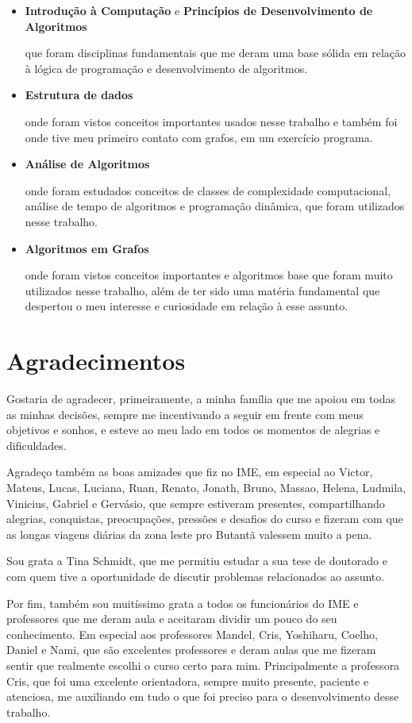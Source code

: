 \documentclass[a4paper,12pt]{article}
\begin{document}
\begin{itemize}
	\item \textbf{Introdução à Computação} e 
	\textbf{Princípios de Desenvolvimento de Algoritmos}


		que foram disciplinas fundamentais que me deram  
		 uma base sólida em relação
		à lógica de programação e desenvolvimento de algoritmos.

	\item \textbf{Estrutura de dados}

		onde foram vistos conceitos importantes usados 
		nesse trabalho e também foi
		onde tive meu primeiro contato com grafos,
		em um exercício programa.
		
	\item \textbf{Análise de Algoritmos}

		onde foram estudados conceitos de classes de complexidade computacional,
		análise de tempo de algoritmos e programação dinâmica, que foram
		utilizados nesse trabalho.

	\item \textbf{Algoritmos em Grafos}
	
		onde foram vistos conceitos importantes e algoritmos 
		base que foram muito utilizados nesse trabalho, 
		além de ter sido uma matéria fundamental que despertou o meu interesse 
		e curiosidade em relação à esse assunto.
\end{itemize}

\newpage

\section{Agradecimentos}
Gostaria de agradecer, primeiramente, a minha família
que me apoiou em todas as minhas decisões, sempre
me incentivando a seguir em frente com meus objetivos e sonhos,
e esteve ao meu lado em todos os momentos de alegrias e dificuldades.

Agradeço também as boas amizades que fiz no IME, em especial
ao Victor, Mateus, Lucas, Luciana, Ruan, Renato, Jonath, Bruno, Massao, 
Helena, Ludmila, Vinicius, Gabriel e Gervásio, que sempre 
estiveram presentes, compartilhando
alegrias, conquistas, preocupações, pressões e desafios do curso
e fizeram com que as longas viagens diárias da zona leste pro Butantã 
valessem muito a pena.

Sou grata a Tina Schmidt, que me permitiu estudar a sua tese de doutorado e
com quem tive a oportunidade de discutir problemas relacionados ao assunto.

Por fim, também sou muitíssimo grata a todos os funcionários do IME e professores que
me deram aula e aceitaram dividir um pouco do seu conhecimento.
Em especial aos professores Mandel, Cris, Yoshiharu, Coelho, Daniel e Nami, que são excelentes
professores e deram aulas que me fizeram sentir que realmente 
escolhi o curso certo para mim.
Principalmente a professora Cris, que foi uma excelente orientadora,
sempre muito presente, paciente e atenciosa, me auxiliando em tudo
o que foi preciso para o desenvolvimento desse trabalho.
\end{document}
